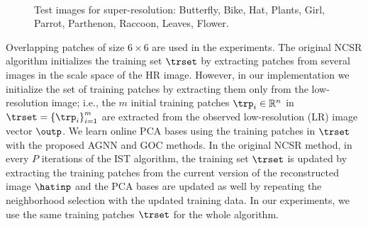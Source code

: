 \documentclass[journal]{IEEEtran}
\begin{document}



\begin{figure}[!t]
\begin{center}
\setcounter{subfigure}{0}   
   
    \\ 
\setcounter{subfigure}{0}   
   
\end{center}
  \caption{Test images for super-resolution: Butterfly, Bike, Hat, Plants, Girl, Parrot, Parthenon, Raccoon, Leaves, Flower.}
\label{fig:images}
\end{figure}

Overlapping patches of size  $6 \times 6$ are used in the experiments. The original NCSR algorithm initializes the training set $\trset$ by extracting patches from several images in the scale space of the HR image. However, in our implementation we initialize the set of training patches by extracting them only from the low-resolution image; i.e., the $m$ initial training patches $\trp_i \in \mathbb{R}^n$ in $\trset= \left\{\trp_i  \right\}_{i=1}^{m}$ are extracted from the observed low-resolution (LR) image vector $\outp$. We learn online PCA bases using the training patches in $\trset$ with the proposed AGNN and GOC methods. In the original NCSR method, in every $P$ iterations of the IST algorithm, the training set $\trset$ is updated by extracting the training patches from the current version of the reconstructed image $\hatinp$ and the PCA bases are updated as well by repeating the neighborhood selection with the updated training data. In our experiments, we use the same training patches $\trset$ for the whole algorithm.
\end{document}

